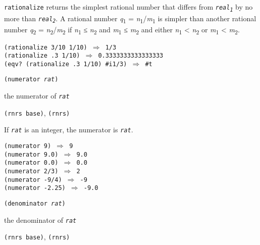\texttt{rationalize}
returns the simplest rational number that differs from
\texttt{\textit{real\textsubscript{1}}} by no more than \texttt{\textit{real\textsubscript{2}}}.
A rational number \textit{q}\textsubscript{1} = \textit{n}\textsubscript{1}/\textit{m}\textsubscript{1} is simpler than another rational
number \textit{q}\textsubscript{2} = \textit{n}\textsubscript{2}/\textit{m}\textsubscript{2} if \textbar{}\textit{n}\textsubscript{1}\textbar{} ≤ \textbar{}\textit{n}\textsubscript{2}\textbar{} and \textbar{}\textit{m}\textsubscript{1}\textbar{} ≤ \textbar{}\textit{m}\textsubscript{2}\textbar{}
and either \textbar{}\textit{n}\textsubscript{1}\textbar{} \textless{} \textbar{}\textit{n}\textsubscript{2}\textbar{} or \textbar{}\textit{m}\textsubscript{1}\textbar{} \textless{} \textbar{}\textit{m}\textsubscript{2}\textbar{}.

\begin{alltt}
(rationalize 3/10 1/10) \(\Rightarrow\) 1/3
(rationalize .3 1/10) \(\Rightarrow\) 0.3333333333333333
(eqv? (rationalize .3 1/10) \#{}i1/3) \(\Rightarrow\) \#{}t
\end{alltt}

\begin{description}

\label{objects_s118}\item[procedure] \texttt{(numerator \textit{rat})}



\item[returns] the numerator of \texttt{\textit{rat}}


\item[libraries] \texttt{(rnrs base)}, \texttt{(rnrs)}
\end{description}


If \texttt{\textit{rat}} is an integer, the numerator is \texttt{\textit{rat}}.


\begin{alltt}
(numerator 9) \(\Rightarrow\) 9
(numerator 9.0) \(\Rightarrow\) 9.0
(numerator 0.0) \(\Rightarrow\) 0.0
(numerator 2/3) \(\Rightarrow\) 2
(numerator -9/4) \(\Rightarrow\) -9
(numerator -2.25) \(\Rightarrow\) -9.0
\end{alltt}

\begin{description}

\label{objects_s119}\item[procedure] \texttt{(denominator \textit{rat})}



\item[returns] the denominator of \texttt{\textit{rat}}


\item[libraries] \texttt{(rnrs base)}, \texttt{(rnrs)}
\end{description}


